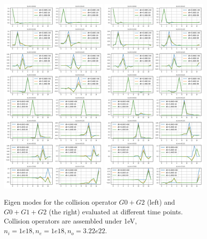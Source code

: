 \documentclass{article}
\begin{document}
\begin{figure}[!htbp]
	\includegraphics[width=0.48\textwidth]{fig/g02_Nr_7_eig_ev_1.00E+00_NI_1.00E+18_N0_3.22E+22_NE_1.00E+18.png}
	\includegraphics[width=0.48\textwidth]{fig/g012_Nr_7_eig_ev_1.00E+00_NI_1.00E+18_N0_3.22E+22_NE_1.00E+18.png}
	\caption{Eigen modes for the collision operator $G0+G2$ (left) and $G0+G1+G2$ (the right) evaluated at different time points. Collision operators are assembled under 1eV, $n_i = 1e18, n_e=1e18, n_o = 3.22e22$.\label{fig:eig_g02_g012}}
\end{figure}
\end{document}

